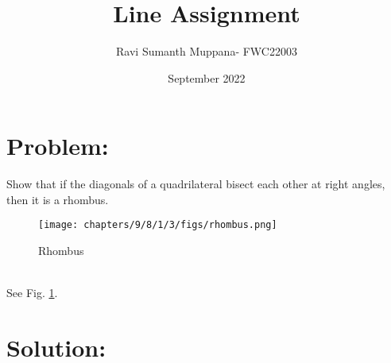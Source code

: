 \documentclass[a4paper,12pt,twocolumn]{article}
\title{Line Assignment}
\author{Ravi Sumanth Muppana- FWC22003}
\date{September 2022}
\begin{document}
\maketitle
\section{Problem:}
\fi
Show that if the diagonals of a quadrilateral bisect each other at right angles, then it is a rhombus.
\begin{figure}[H]
	\centering
	\texttt{[image: chapters/9/8/1/3/figs/rhombus.png]}
	\caption{Rhombus}
	\label{fig:9/8/1/3}
\end{figure}
\\
\solution See Fig. 
	\ref{fig:9/8/1/3}.
\iffalse
\maketitle
\section{Solution:}
\end{document}
